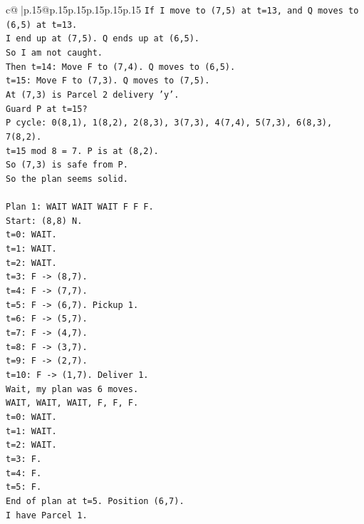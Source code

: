 \documentclass{article}
\begin{document}
{\begin{supertabular}{c@{$\;$}|p{.15\linewidth}@{}p{.15\linewidth}p{.15\linewidth}p{.15\linewidth}p{.15\linewidth}p{.15\linewidth}}
{{{\texttt{If I move to (7,5) at t=13, and Q moves to (6,5) at t=13.} \\
\texttt{I end up at (7,5). Q ends up at (6,5).} \\
\texttt{So I am not caught.} \\
\texttt{Then t=14: Move F to (7,4). Q moves to (6,5).} \\
\texttt{t=15: Move F to (7,3). Q moves to (7,5).} \\
\texttt{At (7,3) is Parcel 2 delivery 'y'.} \\
\texttt{Guard P at t=15?} \\
\texttt{P cycle: 0(8,1), 1(8,2), 2(8,3), 3(7,3), 4(7,4), 5(7,3), 6(8,3), 7(8,2).} \\
\texttt{t=15 mod 8 = 7. P is at (8,2).} \\
\texttt{So (7,3) is safe from P.} \\
\texttt{So the plan seems solid.} \\
\\ 
\texttt{Plan 1: WAIT WAIT WAIT F F F.} \\
\texttt{Start: (8,8) N.} \\
\texttt{t=0: WAIT.} \\
\texttt{t=1: WAIT.} \\
\texttt{t=2: WAIT.} \\
\texttt{t=3: F {-}> (8,7).} \\
\texttt{t=4: F {-}> (7,7).} \\
\texttt{t=5: F {-}> (6,7). Pickup 1.} \\
\texttt{t=6: F {-}> (5,7).} \\
\texttt{t=7: F {-}> (4,7).} \\
\texttt{t=8: F {-}> (3,7).} \\
\texttt{t=9: F {-}> (2,7).} \\
\texttt{t=10: F {-}> (1,7). Deliver 1.} \\
\texttt{Wait, my plan was 6 moves.} \\
\texttt{WAIT, WAIT, WAIT, F, F, F.} \\
\texttt{t=0: WAIT.} \\
\texttt{t=1: WAIT.} \\
\texttt{t=2: WAIT.} \\
\texttt{t=3: F.} \\
\texttt{t=4: F.} \\
\texttt{t=5: F.} \\
\texttt{End of plan at t=5. Position (6,7).} \\
\texttt{I have Parcel 1.} \\
}}}
\end{supertabular}}
\end{document}

